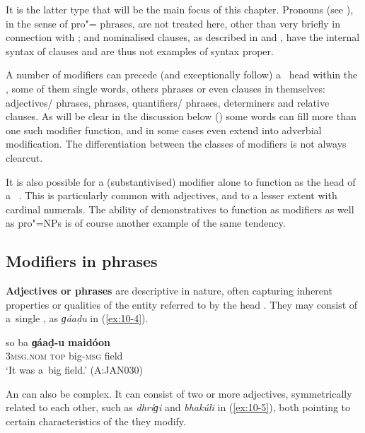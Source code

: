 It is the latter type that will be the main focus of this chapter. Pronouns (see ), in the sense of pro"= phrases, are not treated here, other than very briefly in connection with ; and nominalised clauses, as described in  and , have the internal syntax of clauses and are thus not examples of   syntax proper. 


A number of modifiers can precede (and exceptionally follow) a~ head within the  , some of them single words, others phrases or even clauses in themselves: adjectives/ phrases,  phrases, quantifiers/{\allowbreak} phrases, determiners and relative clauses. As will be clear in the discussion below () some words can fill more than one such modifier function, and in some cases even extend into adverbial modification. The differentiation between the classes of modifiers is not always clearcut.


It is also possible for a (substantivised) modifier alone to function as the head of a~ . This is particularly common with adjectives, and to a lesser extent with cardinal numerals. The ability of demonstratives to function as modifiers as well as pro"=NPs is of course another example of the same tendency.


\subsection{Modifiers in  phrases}
\label{subsec:10-1-2}


\textbf{Adjectives or  phrases} are descriptive in nature, often capturing inherent properties or qualities of the entity referred to by the head . They may consist of a~single , as \textit{ɡáaḍu} in (\ref{ex:10-4}).

\begin{exe}
\ex
\label{ex:10-4}
\gll so ba \textbf{ɡáaḍ-u} \textbf{maidóon} \\
\textsc{3msg.nom} \textsc{top} big-\textsc{msg} field \\
\glt `It was a~big field.' (A:JAN030)
\end{exe}

An   can also be complex. It can consist of two or more adjectives, symmetrically related to each other, such as \textit{dhríɡi} and \textit{bhakúli} in (\ref{ex:10-5}), both pointing to certain characteristics of the  they modify. 

